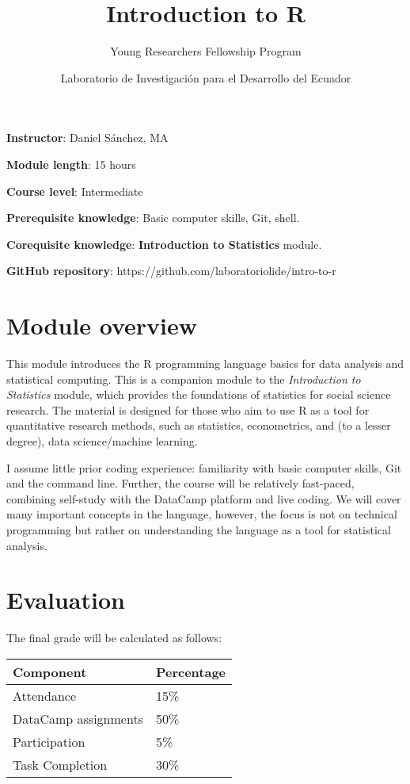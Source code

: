 \documentclass[
  letterpaper,
  DIV=11,
  numbers=noendperiod]{scrartcl}
\title{Introduction to R}
\subtitle{Young Researchers Fellowship Program}
\author{Laboratorio de Investigación para el Desarrollo del Ecuador}
\date{}
\begin{document}
\maketitle

\textbf{Instructor}: Daniel Sánchez, MA

\textbf{Module length}: 15 hours

\textbf{Course level}: Intermediate

\textbf{Prerequisite knowledge}: Basic computer skills, Git, shell.

\textbf{Corequisite knowledge}: \textbf{Introduction to Statistics}
module.

\textbf{GitHub repository}:
https://github.com/laboratoriolide/intro-to-r

\section{Module overview}\label{module-overview}

This module introduces the R programming language basics for data
analysis and statistical computing. This is a companion module to the
\emph{Introduction to Statistics} module, which provides the foundations
of statistics for social science research. The material is designed for
those who aim to use R as a tool for quantitative research methods, such
as statistics, econometrics, and (to a lesser degree), data
science/machine learning.

I assume little prior coding experience: familiarity with basic computer
skills, Git and the command line. Further, the course will be relatively
fast-paced, combining self-study with the DataCamp platform and live
coding. We will cover many important concepts in the language, however,
the focus is not on technical programming but rather on understanding
the language as a tool for statistical analysis.

\section{Evaluation}\label{evaluation}

The final grade will be calculated as follows:

\begin{longtable}[]{@{}ll@{}}
\toprule\noalign{}
Component & Percentage \\
\midrule\noalign{}
\endhead
\bottomrule\noalign{}
\endlastfoot
Attendance & 15\% \\
DataCamp assignments & 50\% \\
Participation & 5\% \\
Task Completion & 30\% \\
\end{longtable}
\end{document}
